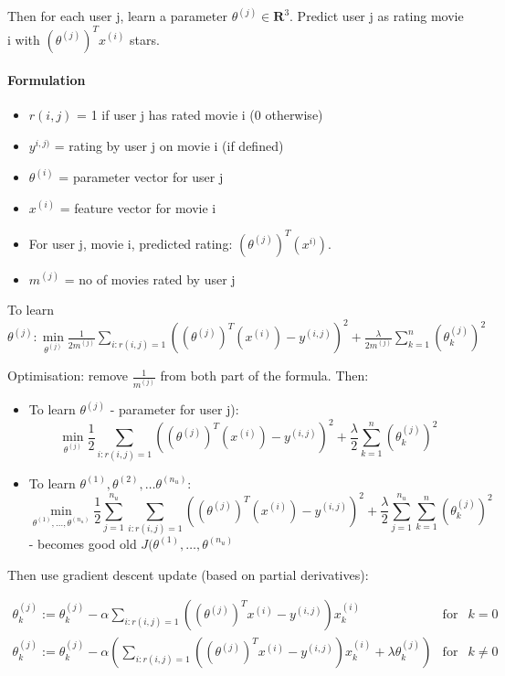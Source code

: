 \documentclass{scrartcl}
\begin{document}
Then for each user j, learn a parameter $\theta^{(j)} \in
\mathbf{R}^3$. Predict user j as rating movie i with $(\theta^{(j)})^T
x^{(i)}$ stars.

\paragraph{Formulation}

\begin{itemize}
\item $r(i, j)$ = 1 if user j has rated movie i (0 otherwise)
\item $y^{i, j)}$ = rating by user j on movie i (if defined)
\item $\theta^{(i)}$ = parameter vector for user j
\item $x^{(i)}$ = feature vector for movie i
\item For user j, movie i, predicted rating:
  $(\theta^{(j)})^T(x^{i)})$.
\item $m^{(j)}$ = no of movies rated by user j
\end{itemize}
To learn $\theta^{(j)}: \min \limits_{\theta^{(j)}} \frac{1}{2
  m^{(j)}} \sum \limits_{i:r(i,j)=1} \left( (\theta^{(j)})^T (x^{(i)})
  - y^{(i, j)} \right)^2 + \frac{\lambda}{2 m^{(j)}} \sum \limits_{k =
  1}^n (\theta_k^{(j)})^2 $

Optimisation: remove $\frac{1}{m^{(j)}}$ from both part of the
formula. Then:
\begin{itemize}
\item To learn $\theta^{(j)}$ - parameter for user j): \[ \min
  \limits_{\theta^{(j)}} \frac{1}{2} \sum \limits_{i:r(i,j)=1} \left(
    (\theta^{(j)})^T (x^{(i)}) - y^{(i, j)} \right)^2 +
  \frac{\lambda}{2} \sum \limits_{k = 1}^n (\theta_k^{(j)})^2 \]
\item To learn $\theta^{(1)}, \theta^{(2)}, \dots \theta^{(n_u)}$: \[
  \min \limits_{\theta^{(1)}, \dots, \theta^{(n_u)}} \frac{1}{2} \sum
  \limits_{j=1}^{n_u} \sum \limits_{i:r(i,j)=1} \left(
    (\theta^{(j)})^T (x^{(i)}) - y^{(i, j)} \right)^2 +
  \frac{\lambda}{2} \sum \limits_{j=1}^{n_u} \sum \limits_{k = 1}^n
  (\theta_k^{(j)})^2 \] - becomes good old $J(\theta^{(1)}, \dots,
  \theta^{(n_u)}$
\end{itemize}

Then use gradient descent update (based on partial derivatives):

\[ \begin{array}{lll} \theta_k^{(j)} := \theta_k^{(j)} - \alpha
  \sum\limits_{i:r(i,j)=1}
  ((\theta^{(j)})^Tx^{(i)} - y^{(i, j)})x_k^{(i)} & \mathrm{ for } & k = 0\\
  \theta_k^{(j)} := \theta_k^{(j)} - \alpha \left(
    \sum\limits_{i:r(i,j)=1} ((\theta^{(j)})^Tx^{(i)} - y^{(i,
      j)})x_k^{(i)} + \lambda \theta_k^{(j)} \right) & \mathrm{ for }
  & k \neq  0\\
\end{array} \]
\end{document}

